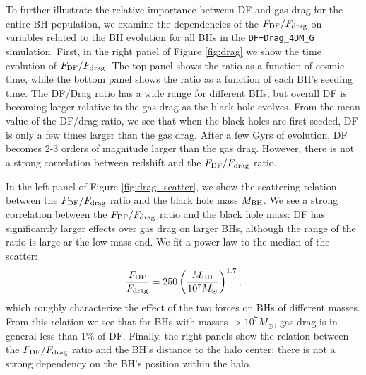 To further illustrate the relative importance between DF and gas drag for the entire BH population, we examine the dependencies of the $F_{\rm DF}/F_{\rm drag}$ on variables related to the BH evolution for all BHs in the \texttt{DF+Drag\_4DM\_G} simulation. First, in the right panel of Figure \ref{fig:drag} we show the time evolution of $F_{\rm DF}/F_{\rm drag}$. The top panel shows the ratio as a function of cosmic time, while the bottom panel shows the ratio as a function of each BH's seeding time. The DF/Drag ratio has a wide range for different BHs, but overall DF is becoming larger relative to the gas drag as the black hole evolves. From the mean value of the DF/drag ratio, we see that when the black holes are first seeded, DF is only a few times larger than the gas drag. After a few Gyrs of evolution, DF becomes 2-3 orders of magnitude larger than the gas drag. However, there is not a strong correlation between redshift and the $F_{\rm DF}/F_{\rm drag}$ ratio. 

In the left panel of Figure \ref{fig:drag_scatter}, we show the scattering relation between the $F_{\rm DF}/F_{\rm drag}$ ratio and the black hole mass $M_{\rm BH}$. We see a strong correlation between the $F_{\rm DF}/F_{\rm drag}$ ratio and the black hole mass: DF has significantly larger effects over gas drag on larger BHs, although the range of the ratio is large ar the low mass end. We fit a power-law to the median of the scatter:
\begin{equation}
    \frac{F_{\rm DF}}{F_{\rm drag}} = 250 \left(\frac{M_{\rm BH}}{10^7 M_\odot}\right)^{1.7},
\end{equation}
which roughly characterize the effect of the two forces on BHs of different masses. From this relation we see that for BHs with masses $>10^7 M_\odot$, gas drag is in general less than $1\%$ of DF. Finally, the right panels show the relation between the $F_{\rm DF}/F_{\rm drag}$ ratio and the BH's distance to the halo center: there is not a strong dependency on the BH's position within the halo.




